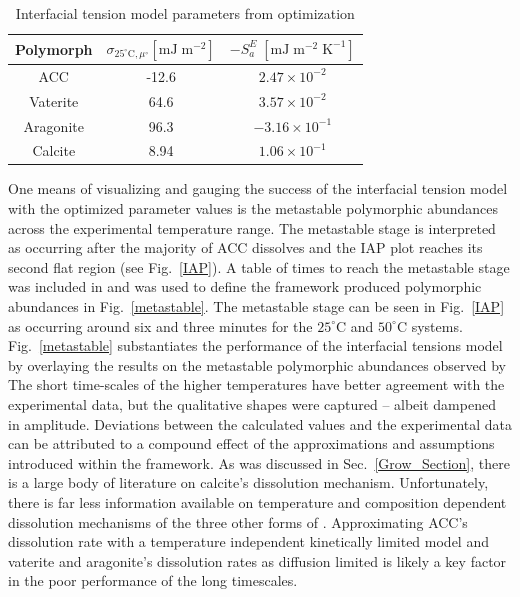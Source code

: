 \documentclass[preprint,3p,a4paper,times,12pt,authoryear]{elsarticle}
\begin{document}
\begin{table}[ht]
\caption{Interfacial tension model parameters from optimization}
\centering
\begin{tabular}{c | c | c}
\hline\hline
Polymorph & $\sigma_{25^\circ\text{C}, \mu^\circ} [\text{mJ} \; \text{m}^{-2}]$ & $-S_a^E \; [\text{mJ} \; \text{m}^{-2} \; \text{K}^{-1}]$ \\ 
\hline
ACC & -12.6 & $2.47 \times 10^{-2}$ \\
Vaterite & 64.6 & $3.57 \times 10^{-2}$ \\
Aragonite & 96.3 & $-3.16 \times 10^{-1}$ \\
Calcite & 8.94 & $1.06 \times 10^{-1}$ \\
\hline
\end{tabular}
\label{optimized_table}
\end{table}

One means of visualizing and gauging the success of the interfacial tension model with the optimized parameter values is the metastable polymorphic abundances across the experimental temperature range. The metastable stage is interpreted as occurring after the majority of ACC dissolves and the IAP plot reaches its second flat region (see Fig.~\ref{IAP}).  A table of times to reach the metastable stage was included in \citet{Ogino1987} and was used to define the framework produced polymorphic abundances in Fig.~\ref{metastable}.  The metastable stage can be seen in Fig.~\ref{IAP} as occurring around six and three minutes for the $25^\circ$C and $50^\circ$C systems.  Fig.~\ref{metastable} substantiates the performance of the interfacial tensions model by overlaying the results on the metastable polymorphic abundances observed by \citeauthor{Ogino1987}  The short time-scales of the higher temperatures have better agreement with the experimental data, but the qualitative shapes were captured -- albeit dampened in amplitude.  Deviations between the calculated values and the experimental data can be attributed to a compound effect of the approximations and assumptions introduced within the framework.  As was discussed in Sec.~\ref{Grow_Section}, there is a large body of literature on calcite's dissolution mechanism.  Unfortunately, there is far less information available on temperature and composition dependent dissolution mechanisms of the three other forms of .  Approximating ACC's dissolution rate with a temperature independent kinetically limited model and vaterite and aragonite's dissolution rates as diffusion limited is likely a key factor in the poor performance of the long timescales.
\end{document}
